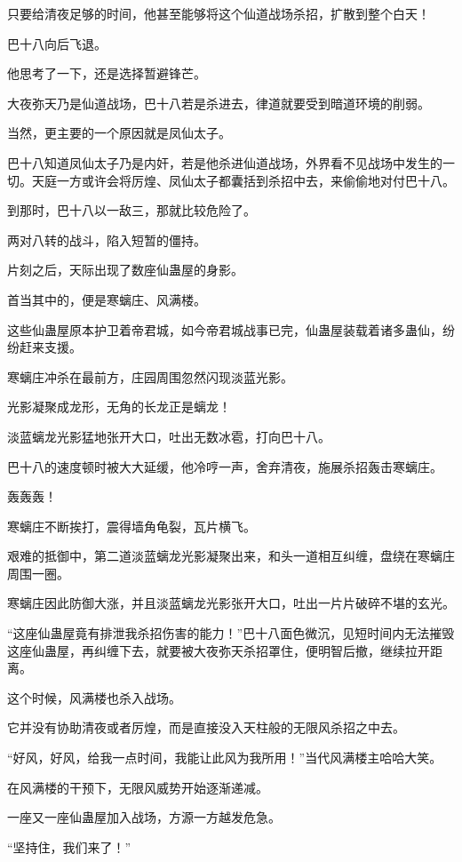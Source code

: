\begin{this_body}
只要给清夜足够的时间，他甚至能够将这个仙道战场杀招，扩散到整个白天！

巴十八向后飞退。

他思考了一下，还是选择暂避锋芒。

大夜弥天乃是仙道战场，巴十八若是杀进去，律道就要受到暗道环境的削弱。

当然，更主要的一个原因就是凤仙太子。

巴十八知道凤仙太子乃是内奸，若是他杀进仙道战场，外界看不见战场中发生的一切。天庭一方或许会将厉煌、凤仙太子都囊括到杀招中去，来偷偷地对付巴十八。

到那时，巴十八以一敌三，那就比较危险了。

两对八转的战斗，陷入短暂的僵持。

片刻之后，天际出现了数座仙蛊屋的身影。

首当其中的，便是寒螭庄、风满楼。

这些仙蛊屋原本护卫着帝君城，如今帝君城战事已完，仙蛊屋装载着诸多蛊仙，纷纷赶来支援。

寒螭庄冲杀在最前方，庄园周围忽然闪现淡蓝光影。

光影凝聚成龙形，无角的长龙正是螭龙！

淡蓝螭龙光影猛地张开大口，吐出无数冰雹，打向巴十八。

巴十八的速度顿时被大大延缓，他冷哼一声，舍弃清夜，施展杀招轰击寒螭庄。

轰轰轰！

寒螭庄不断挨打，震得墙角龟裂，瓦片横飞。

艰难的抵御中，第二道淡蓝螭龙光影凝聚出来，和头一道相互纠缠，盘绕在寒螭庄周围一圈。

寒螭庄因此防御大涨，并且淡蓝螭龙光影张开大口，吐出一片片破碎不堪的玄光。

“这座仙蛊屋竟有排泄我杀招伤害的能力！”巴十八面色微沉，见短时间内无法摧毁这座仙蛊屋，再纠缠下去，就要被大夜弥天杀招罩住，便明智后撤，继续拉开距离。

这个时候，风满楼也杀入战场。

它并没有协助清夜或者厉煌，而是直接没入天柱般的无限风杀招之中去。

“好风，好风，给我一点时间，我能让此风为我所用！”当代风满楼主哈哈大笑。

在风满楼的干预下，无限风威势开始逐渐递减。

一座又一座仙蛊屋加入战场，方源一方越发危急。

“坚持住，我们来了！”


\end{this_body}
